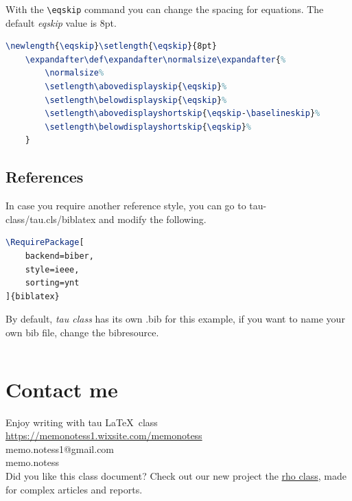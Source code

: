 \documentclass[9pt,a4paper,twoside]{tau-class/tau}
\begin{document}
        With the \verb|\eqskip| command you can change the spacing for equations. The default \textit{eqskip} value is 8pt.

\nolinenumbers
\begin{lstlisting}[language=TeX, caption=Equation skip code.]
	\newlength{\eqskip}\setlength{\eqskip}{8pt}
	\expandafter\def\expandafter\normalsize\expandafter{%
		\normalsize%
		\setlength\abovedisplayskip{\eqskip}%
		\setlength\belowdisplayskip{\eqskip}%
		\setlength\abovedisplayshortskip{\eqskip-\baselineskip}%
		\setlength\belowdisplayshortskip{\eqskip}%
	}
\end{lstlisting}
\linenumbers
		
    \subsection{References}
		
        In case you require another reference style, you can go to tau-class/tau.cls/biblatex and modify the following.
		
\nolinenumbers
\begin{lstlisting}[language=TeX, caption=References style.]
\RequirePackage[
	backend=biber,
	style=ieee,
	sorting=ynt
]{biblatex}
\end{lstlisting}
\linenumbers

        By default, \textit{tau class} has its own .bib for this example, if you want to name your own bib file, change the bibresource.
		
\nolinenumbers
\begin{lstlisting}[language=TeX]

\end{lstlisting}
\linenumbers

\section{Contact me}

    Enjoy writing with tau \LaTeX\ class\hspace{5pt}\faChessKnight \\ 
    \noindent\faWix\hspace{5pt}\href{https://memonotess1.wixsite.com/memonotess}{https://memonotess1.wixsite.com/memonotess} \\
    \faEnvelope[regular]\hspace{7pt}memo.notess1@gmail.com \\
    \faInstagram\hspace{8pt}memo.notess\\

    \noindent Did you like this class document? Check out our new project the \href{https://es.overleaf.com/latex/templates/rho-class-academic-article-template/bpgjxjjqhtfy}{rho class}, made for complex articles and reports.
    

\printbibliography

\end{document}
